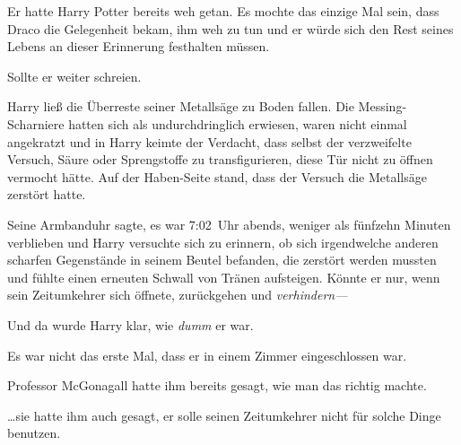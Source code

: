 Er hatte Harry Potter bereits weh getan. Es mochte das einzige Mal sein, dass Draco die Gelegenheit bekam, ihm weh zu tun und er würde sich den Rest seines Lebens an dieser Erinnerung festhalten müssen.

Sollte er weiter schreien.

\later

Harry ließ die Überreste seiner Metallsäge zu Boden fallen. Die Messing-Scharniere hatten sich als undurchdringlich erwiesen, waren nicht einmal angekratzt und in Harry keimte der Verdacht, dass selbst der verzweifelte Versuch, Säure oder Sprengstoffe zu transfigurieren, diese Tür nicht zu öffnen vermocht hätte. Auf der Haben-Seite stand, dass der Versuch die Metallsäge zerstört hatte.

Seine Armbanduhr sagte, es war 7:02~Uhr abends, weniger als fünfzehn Minuten verblieben und Harry versuchte sich zu erinnern, ob sich irgendwelche anderen scharfen Gegenstände in seinem Beutel befanden, die zerstört werden mussten und fühlte einen erneuten Schwall von Tränen aufsteigen. Könnte er nur, wenn sein Zeitumkehrer sich öffnete, zurückgehen und \emph{verhindern—}

Und da wurde Harry klar, wie \emph{dumm} er war.

Es war nicht das erste Mal, dass er in einem Zimmer eingeschlossen war.

Professor McGonagall hatte ihm bereits gesagt, wie man das richtig machte.

…sie hatte ihm auch gesagt, er solle seinen Zeitumkehrer nicht für solche Dinge benutzen.

